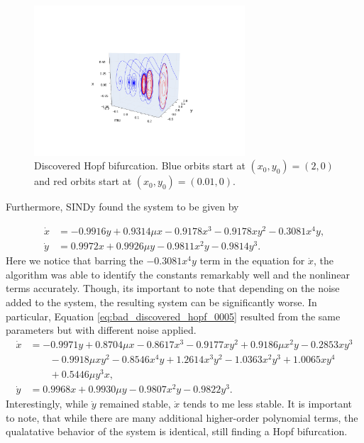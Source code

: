 \documentclass[10pt]{paper}
\begin{document}
\begin{figure}[h]
	\caption{Discovered Hopf bifurcation. Blue orbits start at $(x_0, y_0) = (2,0)$ and red orbits start at $(x_0, y_0) = (0.01, 0)$.}
	\label{fig:discovered_hopf_0005}

	\centering 

	\includegraphics[width = 0.7\textwidth, trim={4.3cm, 1.9cm, 4.3cm, 3.5cm}, clip]{found_hopf_bifurcation_0005.pdf}
\end{figure}

Furthermore, SINDy found the system to be given by 

\begin{equation}\label{eq:discovered_hopf_0005}
	\begin{split}
		\dot x &= -0.9916y + 0.9314\mu x - 0.9178x^3 - 0.9178xy^2 - 0.3081x^4y, \\
		\dot y &= 0.9972x + 0.9926\mu y - 0.9811x^2y - 0.9814y^3.
	\end{split}
\end{equation}
Here we notice that barring the $-0.3081x^4y$ term in the equation for $\dot x$, the algorithm was able to identify the constants remarkably well and the nonlinear terms accurately. 
Though, its important to note that depending on the noise added to the system, the resulting system can be significantly worse. In particular, Equation \ref{eq:bad_discovered_hopf_0005} resulted from the same parameters but with different noise applied. 
\begin{equation}\label{eq:bad_discovered_hopf_0005}
	\begin{split}
		\dot x &= -0.9971y + 0.8704\mu x - 0.8617x^3 - 0.9177xy^2 + 0.9186\mu x^2 y  - 0.2853 xy^3 \\
		&\qquad - 0.9918 \mu x y^2 - 0.8546 x^4y + 1.2614 x^3y^2 - 1.0363 x^2y^3 + 1.0065 xy^4 \\ &\qquad + 0.5446\mu y^3 x, \\
		\dot y &= 0.9968x + 0.9930\mu y - 0.9807x^2y - 0.9822 y^3.
	\end{split}
\end{equation}
Interestingly, while $\dot y$ remained stable, $\dot x$ tends to me less stable. It is important to note, that while there are many additional higher-order polynomial terms, the qualatative behavior of the system is identical, still finding a Hopf bifurcation.
\end{document}
